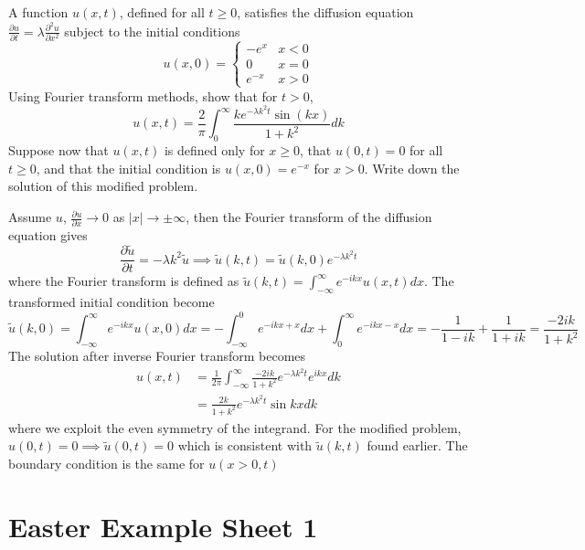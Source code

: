 \documentclass[a4paper]{article}
\begin{document}
\newpage
\begin{qns}
A function $u(x,t)$, defined for all $t\geq0$, satisfies the diffusion equation $\frac{\partial u}{\partial t}=\lambda\frac{\partial^2u}{\partial x^2}$ subject to the initial conditions 
$$u(x,0)=
\left\{
        \begin{array}{ll}
      -e^x & x<0 \\
      0 & x=0\\
      e^{-x} & x>0
        \end{array}
    \right.$$
Using Fourier transform methods, show that for $t>0$,
$$u(x,t)=\frac{2}{\pi}\int_0^\infty\frac{ke^{-\lambda k^2t}\sin(kx)}{1+k^2}dk$$
Suppose now that $u(x,t)$ is defined only for $x\geq0$, that $u(0,t)=0$ for all $t\geq0$, and that the initial condition is $u(x,0)=e^{-x}$ for $x > 0$. Write down the solution of this modified problem.
\end{qns}
\begin{ans}
Assume $u$, $\frac{\partial u}{\partial x}\rightarrow 0$ as $|x|\rightarrow\pm\infty$, then the Fourier transform of the diffusion equation gives
$$\frac{\partial\tilde{u}}{\partial t}=-\lambda k^2\tilde{u}\implies\tilde{u}(k,t)=\tilde{u}(k,0)e^{-\lambda k^2t}$$
where the Fourier transform is defined as $\tilde{u}(k,t)=\int_{-\infty}^\infty e^{-ikx}u(x,t)dx$. The transformed initial condition become
$$\tilde{u}(k,0)=\int_{-\infty}^\infty e^{-ikx}u(x,0)dx=-\int_{-\infty}^0e^{-ikx+x}dx+\int_0^\infty e^{-ikx-x}dx=-\frac{1}{1-ik}+\frac{1}{1+ik}=\frac{-2ik}{1+k^2}$$
The solution after inverse Fourier transform becomes
\begin{align}
    u(x,t)&=\frac{1}{2\pi}\int_{-\infty}^\infty\frac{-2ik}{1+k^2}e^{-\lambda k^2t}e^{ikx}dk\nonumber\\&=\frac{2k}{1+k^2}e^{-\lambda k^2t}\sin kxdk\nonumber
\end{align}
where we exploit the even symmetry of the integrand. For the modified problem, $u(0,t)=0\implies\tilde{u}(0,t)=0$ which is consistent with $\tilde{u}(k,t)$ found earlier. The boundary condition is the same for $u(x>0,t)$
\end{ans}
\newpage
\section{Easter Example Sheet 1}
\end{document}
